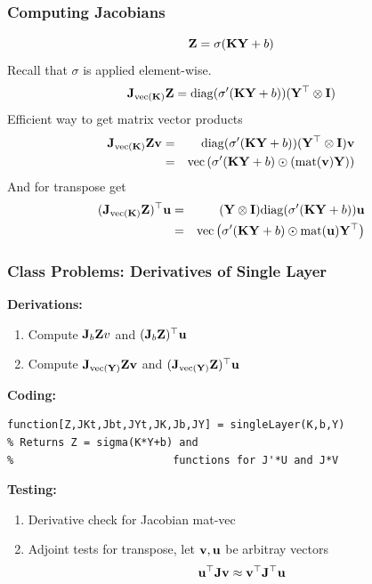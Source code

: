 \documentclass[12pt,fleqn,handout]{beamer}
\begin{document}
\begin{frame}[fragile]\frametitle{Computing Jacobians}
$$
{\bf Z} = \sigma({\bf K}{\bf Y} + b)
$$
Recall that $\sigma$ is applied element-wise.
$$
	{\bf J}_{{\rm vec}({\bf K})}{\bf Z} = {\rm diag}(\sigma'({\bf K} {\bf Y} + b)) ({\bf Y}^\top \otimes {\bf I})
$$
\pause
Efficient way to get matrix vector products
\begin{eqnarray*}
{\bf J}_{{\rm vec}({\bf K})}{\bf Z} {\bf v} &=& {\rm diag}(\sigma'({\bf K} {\bf Y} + b)) ({\bf Y}^\top \otimes {\bf I}){\bf v}\\
                            &=& {\rm vec} \left(\sigma'({\bf K} {\bf Y} + b) \odot ( {\rm mat}({\bf v}) {\bf Y} )\right)
\end{eqnarray*}
And for transpose get
\begin{eqnarray*}
({\bf J}_{{\rm vec}({\bf K})}{\bf Z})^\top {\bf u} &=& ({\bf Y} \otimes {\bf I}) {\rm diag}(\sigma'({\bf K} {\bf Y} + b)) {\bf u}\\
                            &=& {\rm vec} \left(\sigma'({\bf K} {\bf Y} + b) \odot  {\rm mat}({\bf u}){\bf Y}^\top\right) 
\end{eqnarray*}

\end{frame}




\begin{frame}[fragile]\frametitle{Class Problems: Derivatives of Single Layer}

\textbf{Derivations:}
\begin{enumerate}
	
	\item Compute ${\bf J}_{b}{\bf Z} v$ and $({\bf J}_{b}{\bf Z})^\top {\bf u}$

	\item Compute ${\bf J}_{{\rm vec}({\bf Y})}{\bf Z}  {\bf v}$ and $({\bf J}_{{\rm vec}({\bf Y})}{\bf Z})^\top  {\bf u}$
\end{enumerate}

\textbf{Coding:}
\begin{verbatim}
function[Z,JKt,Jbt,JYt,JK,Jb,JY] = singleLayer(K,b,Y)
% Returns Z = sigma(K*Y+b) and 
%                         functions for J'*U and J*V
\end{verbatim}

\textbf{Testing:}
\begin{enumerate}
	\item Derivative check for Jacobian mat-vec
	\item Adjoint tests for transpose, let ${\bf v},{\bf u}$ be arbitray vectors
	$$
		{\bf u}^\top {\bf J} {\bf v} \approx {\bf v}^\top {\bf J}^\top {\bf u}
	$$
\end{enumerate}

\end{frame}
\end{document}
